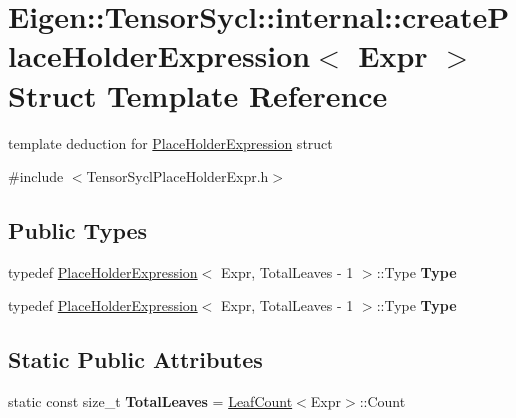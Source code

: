 \hypertarget{struct_eigen_1_1_tensor_sycl_1_1internal_1_1create_place_holder_expression}{}\section{Eigen\+:\+:Tensor\+Sycl\+:\+:internal\+:\+:create\+Place\+Holder\+Expression$<$ Expr $>$ Struct Template Reference}
\label{struct_eigen_1_1_tensor_sycl_1_1internal_1_1create_place_holder_expression}


template deduction for \hyperlink{struct_eigen_1_1_tensor_sycl_1_1internal_1_1_place_holder_expression}{Place\+Holder\+Expression} struct  




{\ttfamily \#include $<$Tensor\+Sycl\+Place\+Holder\+Expr.\+h$>$}

\subsection*{Public Types}
\begin{DoxyCompactItemize}
\item 
\mbox{\label{struct_eigen_1_1_tensor_sycl_1_1internal_1_1create_place_holder_expression_a09ba240be611f0fe15c1e9d6d8cf2ca6}} 
typedef \hyperlink{struct_eigen_1_1_tensor_sycl_1_1internal_1_1_place_holder_expression}{Place\+Holder\+Expression}$<$ Expr, Total\+Leaves -\/ 1 $>$\+::Type {\bfseries Type}
\item 
\mbox{\label{struct_eigen_1_1_tensor_sycl_1_1internal_1_1create_place_holder_expression_a09ba240be611f0fe15c1e9d6d8cf2ca6}} 
typedef \hyperlink{struct_eigen_1_1_tensor_sycl_1_1internal_1_1_place_holder_expression}{Place\+Holder\+Expression}$<$ Expr, Total\+Leaves -\/ 1 $>$\+::Type {\bfseries Type}
\end{DoxyCompactItemize}
\subsection*{Static Public Attributes}
\begin{DoxyCompactItemize}
\item 
\mbox{\label{struct_eigen_1_1_tensor_sycl_1_1internal_1_1create_place_holder_expression_a7a3de70987b88833ed32fed5a97f9012}} 
static const size\+\_\+t {\bfseries Total\+Leaves} = \hyperlink{struct_eigen_1_1_tensor_sycl_1_1internal_1_1_leaf_count}{Leaf\+Count}$<$Expr$>$\+::Count
\end{DoxyCompactItemize}


